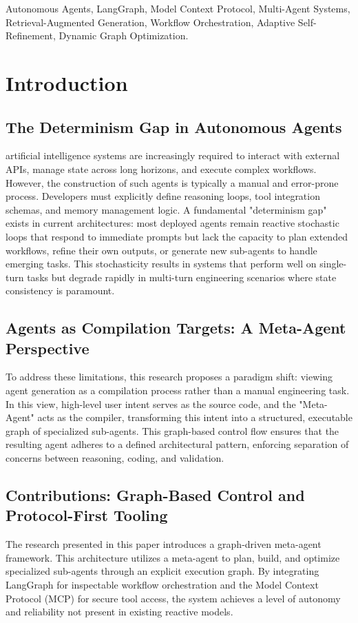 \documentclass[lettersize,journal]{IEEEtran}
\begin{document}
\begin{IEEEkeywords}
Autonomous Agents, LangGraph, Model Context Protocol, Multi-Agent Systems, Retrieval-Augmented Generation, Workflow Orchestration, Adaptive Self-Refinement, Dynamic Graph Optimization.
\end{IEEEkeywords}

\section{Introduction}

\subsection{The Determinism Gap in Autonomous Agents}
 artificial intelligence systems are increasingly required to interact with external APIs, manage state across long horizons, and execute complex workflows. However, the construction of such agents is typically a manual and error-prone process. Developers must explicitly define reasoning loops, tool integration schemas, and memory management logic. A fundamental "determinism gap" exists in current architectures: most deployed agents remain reactive stochastic loops that respond to immediate prompts but lack the capacity to plan extended workflows, refine their own outputs, or generate new sub-agents to handle emerging tasks. This stochasticity results in systems that perform well on single-turn tasks but degrade rapidly in multi-turn engineering scenarios where state consistency is paramount.

\subsection{Agents as Compilation Targets: A Meta-Agent Perspective}
To address these limitations, this research proposes a paradigm shift: viewing agent generation as a compilation process rather than a manual engineering task. In this view, high-level user intent serves as the source code, and the "Meta-Agent" acts as the compiler, transforming this intent into a structured, executable graph of specialized sub-agents. This graph-based control flow ensures that the resulting agent adheres to a defined architectural pattern, enforcing separation of concerns between reasoning, coding, and validation.

\subsection{Contributions: Graph-Based Control and Protocol-First Tooling}
The research presented in this paper introduces a graph-driven meta-agent framework. This architecture utilizes a meta-agent to plan, build, and optimize specialized sub-agents through an explicit execution graph. By integrating LangGraph for inspectable workflow orchestration and the Model Context Protocol (MCP) for secure tool access, the system achieves a level of autonomy and reliability not present in existing reactive models.
\end{document}

